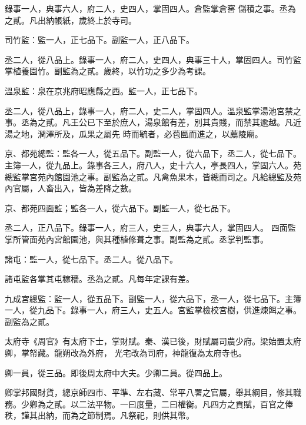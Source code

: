 \begin{pinyinscope}
 錄事一人，典事六人，府二人，史四人，掌固四人。倉監掌倉窖
 儲積之事。丞為之貳。凡出納帳紙，歲終上於寺司。



 司竹監：監一人，正七品下。副監一人，正八品下。



 丞二人，從八品上。錄事一人，府二人，史四人，典事三十人，掌固四人。司竹監掌植養園竹。副監為之貳。歲終，以竹功之多少為考課。



 溫泉監：泉在京兆府昭應縣之西。監一人，正七品下。



 丞二人，從八品上，錄事一人，府二人，史二人，掌固四人。溫泉監掌湯池宮禁之事。丞為之貳。凡王公已下至於庶人，湯泉館有差，別其貴賤，而禁其逾越。凡近湯之地，潤澤所及，瓜果之屬先
 時而毓者，必苞匭而進之，以薦陵廟。



 京、都苑總監：監各一人，從五品下。副監一人，從六品下，丞二人，從七品下。主簿一人，從九品上。錄事各三人，府八人，史十六人，亭長四人，掌固六人。苑總監掌宮苑內館園池之事。副監為之貳。凡禽魚果木，皆總而司之。凡給總監及苑內官屬，人畜出入，皆為差降之數。



 京、都苑四面監；監各一人，從六品下。副監一人，從七品下。



 丞二人，正八品下。錄事一人，府三人，史三人，典事六人，掌固四人。
 四面監掌所管面苑內宮館園池，與其種植修葺之事。副監為之貳。丞掌判監事。



 諸屯：監一人，從七品下。丞二人。從八品下。



 諸屯監各掌其屯稼穡。丞為之貳。凡每年定課有差。



 九成宮總監：監一人，從五品下。副監一人，從六品下，丞一人，從七品下。主簿一人，從九品下。錄事一人，府三人，史五人。宮監掌檢校宮樹，供進煉餌之事。副監為之貳。



 太府寺《周官》有太府下士，掌財賦。秦、漢已後，財賦屬司農少府。梁始置太府卿，掌帑藏。龍朔改為外府，
 光宅改為司府，神龍復為太府寺也。



 卿一員，從三品。即後周太府中大夫。少卿二員。從四品上。



 卿掌邦國財貨，總京師四市、平準、左右藏、常平八署之官屬，舉其綱目，修其職務。少卿為之貳。以二法平物。一曰度量，二曰權衡。凡四方之貢賦，百官之俸秩，謹其出納，而為之節制焉。凡祭祀，則供其幣。




\end{pinyinscope}
